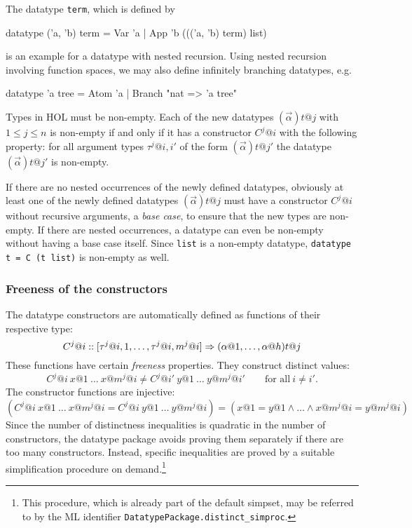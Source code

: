 The datatype \texttt{term}, which is defined by
\begin{ttbox}
datatype ('a, 'b) term = Var 'a
                       | App 'b ((('a, 'b) term) list)
\end{ttbox}
is an example for a datatype with nested recursion. Using nested recursion
involving function spaces, we may also define infinitely branching datatypes, e.g.
\begin{ttbox}
datatype 'a tree = Atom 'a | Branch "nat => 'a tree"
\end{ttbox}

\medskip

Types in HOL must be non-empty. Each of the new datatypes
$(\vec{\alpha})t@j$ with $1 \leq j \leq n$ is non-empty if and only if it has a
constructor $C^j@i$ with the following property: for all argument types
$\tau^j@{i,i'}$ of the form $(\vec{\alpha})t@{j'}$ the datatype
$(\vec{\alpha})t@{j'}$ is non-empty.

If there are no nested occurrences of the newly defined datatypes, obviously
at least one of the newly defined datatypes $(\vec{\alpha})t@j$
must have a constructor $C^j@i$ without recursive arguments, a \emph{base
  case}, to ensure that the new types are non-empty. If there are nested
occurrences, a datatype can even be non-empty without having a base case
itself. Since \texttt{list} is a non-empty datatype, \texttt{datatype t = C (t
  list)} is non-empty as well.


\subsubsection{Freeness of the constructors}

The datatype constructors are automatically defined as functions of their
respective type:
\[ C^j@i :: [\tau^j@{i,1},\dots,\tau^j@{i,m^j@i}] \To (\alpha@1,\dots,\alpha@h)t@j \]
These functions have certain {\em freeness} properties.  They construct
distinct values:
\[
C^j@i~x@1~\dots~x@{m^j@i} \neq C^j@{i'}~y@1~\dots~y@{m^j@{i'}} \qquad
\mbox{for all}~ i \neq i'.
\]
The constructor functions are injective:
\[
(C^j@i~x@1~\dots~x@{m^j@i} = C^j@i~y@1~\dots~y@{m^j@i}) =
(x@1 = y@1 \land \dots \land x@{m^j@i} = y@{m^j@i})
\]
Since the number of distinctness inequalities is quadratic in the number of
constructors, the datatype package avoids proving them separately if there are
too many constructors. Instead, specific inequalities are proved by a suitable
simplification procedure on demand.\footnote{This procedure, which is already part
of the default simpset, may be referred to by the ML identifier
\texttt{DatatypePackage.distinct_simproc}.}

